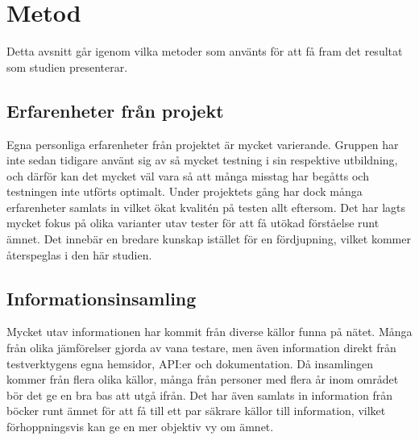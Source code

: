\section{Metod}
\label{sec:david-method}
Detta avsnitt går igenom vilka metoder som använts för att få fram det resultat som studien presenterar.


\subsection{Erfarenheter från projekt}
Egna personliga erfarenheter från projektet är mycket varierande. Gruppen har inte sedan tidigare använt sig av så mycket testning i sin respektive utbildning, och därför kan det mycket väl vara så att många misstag har begåtts och testningen inte utförts optimalt. Under projektets gång har dock många erfarenheter samlats in vilket ökat kvalitén på testen allt eftersom. Det har lagts mycket fokus på olika varianter utav tester för att få utökad förståelse runt ämnet. Det innebär en bredare kunskap istället för en fördjupning, vilket kommer återspeglas i den här studien.

\subsection{Informationsinsamling}
Mycket utav informationen har kommit från diverse källor funna på nätet. Många från olika jämförelser gjorda av vana testare, men även information direkt från testverktygens egna hemsidor, API:er och dokumentation. Då insamlingen kommer från flera olika källor, många från personer med flera år inom området bör det ge en bra bas att utgå ifrån. Det har även samlats in information från böcker runt ämnet för att få till ett par säkrare källor till information, vilket förhoppningsvis kan ge en mer objektiv vy om ämnet.